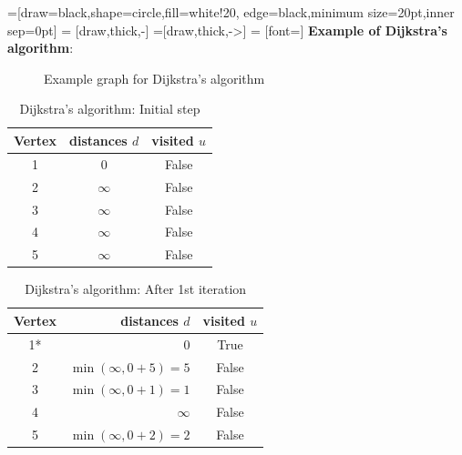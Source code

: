 \documentclass[a4paper,11pt]{book}
\begin{document}
=[draw=black,shape=circle,fill=white!20, edge=black,minimum size=20pt,inner sep=0pt]
 = [draw,thick,-]
 =[draw,thick,->]
 = [font=\scriptsize]
\noindent \textbf{Example of Dijkstra's algorithm}:
\begin{figure}[ht]
\centering
{}
\caption{Example graph for Dijkstra's algorithm}
\end{figure}

\begin{table}[H]
\centering
\begin{tabular}{|c|c|c|}
\hline
\multicolumn{1}{|l|}{\textbf{Vertex}} & \textbf{distances  $d$} & \textbf{visited $u$} \\ \hline
1   & 0             & False     \\ 
2   & $\infty$      & False     \\ 
3   & $\infty$      & False     \\ 
4   & $\infty$      & False     \\ 
5   & $\infty$      & False     \\ \hline
\end{tabular}
\caption{Dijkstra's algorithm: Initial step}
\end{table}

\begin{table}[H]
\centering
\begin{tabular}{|c|r|c|}
\hline
\multicolumn{1}{|l|}{\textbf{Vertex}} & \textbf{distances  $d$} & \textbf{visited $u$} \\ \hline
1*   & 0             & True     \\ 
2   & $\min(\infty, 0+5)=5$      & False     \\ 
3   & $\min(\infty, 0+1)=1$      & False     \\ 
4   &  $\infty$     & False     \\ 
5   & $\min(\infty, 0+2)=2$      & False     \\ \hline
\end{tabular}
\caption{Dijkstra's algorithm: After 1st iteration}
\end{table}
\end{document}
